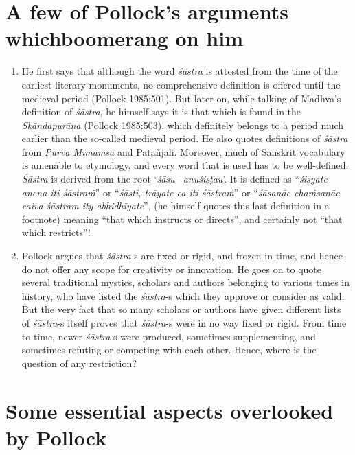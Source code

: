 \section*{A few of Pollock’s arguments which\newline boomerang on him}

\begin{enumerate}
\item He first says that although the word {\sl śāstra} is attested from the time of the earliest literary monuments, no comprehensive definition is offered until the medieval period (Pollock 1985:501). But later on, while talking of Madhva's definition of {\sl śāstra}, he himself says it is that which is found in the {\sl Skāndapurāṇa} (Pollock 1985:503), which definitely belongs to a period much earlier than the so-called medieval period. He also quotes definitions of {\sl śāstra} from {\sl Pūrva Mīmāṁsā} and Patañjali. Moreover, much of Sanskrit vocabulary is amenable to  etymology, and every word that is used has to be well-defined. {\sl Śāstra} is derived from the root `{\sl śāsu --anuśiṣṭau}'. It is defined as ``{\sl śiṣyate anena iti śāstraṁ}'' or ``{\sl śāsti, trāyate ca iti śāstraṁ}'' or ``{\sl śāsanāc chaṁsanāc caiva śāstram ity abhidhīyate}'', (he himself quotes this last definition in a footnote) meaning ``that which instructs or directs'', and certainly not ``that which restricts''!

\item Pollock argues that {\sl śāstra}-s are fixed or rigid, and frozen in time, and hence do not offer any scope for creativity or innovation. He goes on to quote several traditional mystics, scholars and authors belonging to various times in history, who have listed the {\sl śāstra}-s which they approve or consider as valid. But the very fact that so many scholars or authors have given different lists of {\sl śāstra}-s itself proves that {\sl śāstra}-s were in no way fixed or rigid. From time to time, newer {\sl śāstra}-s were produced, sometimes supplementing, and sometimes refuting or competing with each other. Hence, where is the question of any restriction?
\end{enumerate}

\section*{Some essential aspects overlooked by Pollock}

